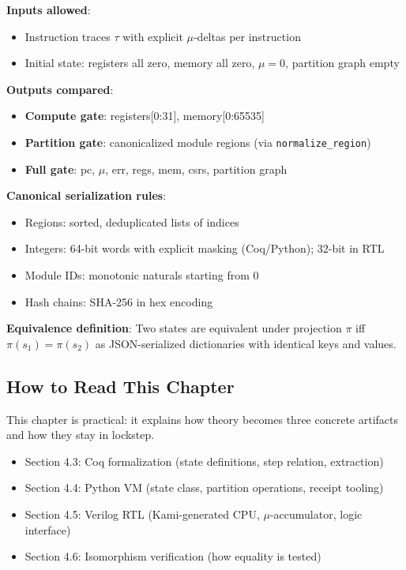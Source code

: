 \begin{tcolorbox}[thesisbox,colback=blue!5!white,colframe=blue!75!black,title=3-Layer Comparison Contract]
\textbf{Inputs allowed}:
\begin{itemize}
    \item Instruction traces $\tau$ with explicit $\mu$-deltas per instruction
    \item Initial state: registers all zero, memory all zero, $\mu = 0$, partition graph empty
\end{itemize}

\textbf{Outputs compared}:
\begin{itemize}
    \item \textbf{Compute gate}: registers[0:31], memory[0:65535]
    \item \textbf{Partition gate}: canonicalized module regions (via \texttt{normalize\_region})
    \item \textbf{Full gate}: pc, $\mu$, err, regs, mem, csrs, partition graph
\end{itemize}

\textbf{Canonical serialization rules}:
\begin{itemize}
    \item Regions: sorted, deduplicated lists of indices
    \item Integers: 64-bit words with explicit masking (Coq/Python); 32-bit in RTL
    \item Module IDs: monotonic naturals starting from 0
    \item Hash chains: SHA-256 in hex encoding
\end{itemize}

\textbf{Equivalence definition}: Two states are equivalent under projection $\pi$ iff $\pi(s_1) = \pi(s_2)$ as JSON-serialized dictionaries with identical keys and values.
\end{tcolorbox}

\subsection{How to Read This Chapter}

This chapter is practical: it explains how theory becomes three concrete artifacts and how they stay in lockstep.
\begin{itemize}
    \item Section 4.3: Coq formalization (state definitions, step relation, extraction)
    \item Section 4.4: Python VM (state class, partition operations, receipt tooling)
    \item Section 4.5: Verilog RTL (Kami-generated CPU, $\mu$-accumulator, logic interface)
    \item Section 4.6: Isomorphism verification (how equality is tested)
\end{itemize}

